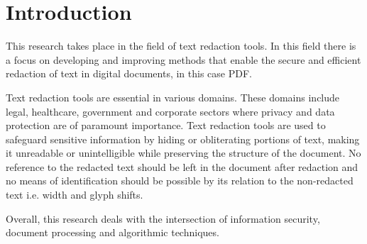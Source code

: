 \section{Introduction}
\label{sec:introduction}

This research takes place in the field of text redaction tools. In this field there is a focus on developing and improving methods that enable the secure and efficient redaction of text in digital documents, in this case PDF. 

Text redaction tools are essential in various domains. These domains include legal, healthcare, government and corporate sectors where privacy and data protection are of paramount importance. Text redaction tools are used to safeguard sensitive information by hiding or obliterating portions of text, making it unreadable or unintelligible while preserving the structure of the document. No reference to the redacted text should be left in the document after redaction and no means of identification should be possible by its relation to the non-redacted text i.e. width and glyph shifts.   

Overall, this research deals with the intersection of information security, document processing and algorithmic techniques.
